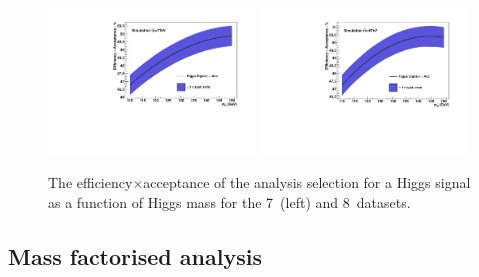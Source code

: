 \begin{figure}
  \includegraphics[width=0.49\textwidth]{analysis/plots/effAcc_vs_mass_7TeV.pdf}
  \includegraphics[width=0.49\textwidth]{analysis/plots/effAcc_vs_mass_8TeV.pdf}
  \caption[The efficiency$\times$acceptance of the analysis selection for \SM Higgs \MC]{The efficiency$\times$acceptance of the analysis selection for a \SM Higgs signal as a function of Higgs mass for the 7~\TeV (left) and 8~\TeV datasets.}
  \label{fig:effacc}
\end{figure}

\subsection{Mass factorised analysis}
\label{sec:signal_mfm}

